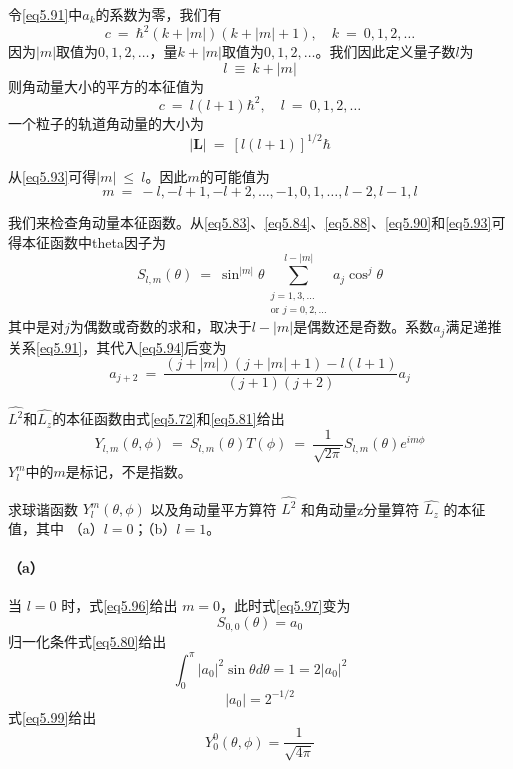 \documentclass[12pt,a4paper,openany]{ctexbook}
\newcommand{\abs}[1]{\left| #1 \right|}
\newcommand{\amv}{\boldsymbol{L}} %
\begin{document}
\begin{flushleft}
令\eqref{eq5.91}中$a_k$的系数为零，我们有
\begin{equation}
    c\ =\ \hbar^2(k+\abs{m})(k+\abs{m}+1),\quad k\ =\ 0,1,2,\dots \label{eq5.92}
\end{equation}
因为$\abs{m}$取值为$0,1,2,\dots$，量$k+\abs{m}$取值为$0,1,2,\dots$。我们因此定义量子数$l$为
\begin{equation}
    l\ \equiv\ k+\abs{m} \label{eq5.93}
\end{equation}
则角动量大小的平方的本征值为
\begin{equation}
    c\ =\ l(l+1)\hbar^2,\quad l\ =\ 0,1,2,\dots \label{eq5.94}
\end{equation}
一个粒子的轨道角动量的大小为
\begin{equation}
    \abs{\amv}\ =\ [l(l+1)]^{1/2}\hbar \label{eq5.95}
\end{equation}

从\eqref{eq5.93}可得$\abs{m}\ \leq\ l$。因此$m$的可能值为
\begin{equation}
    m\ =\ -l,-l+1,-l+2,\dots,-1,0,1,\dots,l-2,l-1,l \label{eq5.96}
\end{equation}

我们来检查角动量本征函数。从\eqref{eq5.83}、\eqref{eq5.84}、\eqref{eq5.88}、\eqref{eq5.90}和\eqref{eq5.93}可得本征函数中theta因子为
\begin{equation}
    S_{l,m}(\theta)\ =\ \sin^{\abs{m}}\theta\sum_{\substack{j=1,3,\ldots \\ \text{or } j=0,2,\ldots}}^{l-\abs{m}}a_j\cos^j\theta \label{eq5.97}
\end{equation}
其中是对$j$为偶数或奇数的求和，取决于$l-\abs{m}$是偶数还是奇数。系数$a_j$满足递推关系\eqref{eq5.91}，其代入\eqref{eq5.94}后变为
\begin{equation}
    a_{j+2}\ =\ \frac{(j+\abs{m})(j+\abs{m}+1)-l(l+1)}{(j+1)(j+2)}a_j \label{eq5.98}
\end{equation}

$\hat{L^2}$和$\hat{L_z}$的本征函数由式\eqref{eq5.72}和\eqref{eq5.81}给出
\begin{equation}
    \boxed{Y_{l,m}(\theta,\phi)\ =\ S_{l,m}(\theta)T(\phi)\ =\ \frac{1}{\sqrt{2\pi}}S_{l,m}(\theta)e^{im\phi}} \label{eq5.99}
\end{equation}
$Y_l^m$中的$m$是标记，不是指数。
\begin{examplebox}
求球谐函数 \(Y_l^m(\theta,\phi)\) 以及角动量平方算符 \(\hat{L^2}\) 和角动量z分量算符 \(\hat{L_z}\) 的本征值，其中 （a）\(l=0\)；（b）\(l=1\)。

\paragraph{（a）} 当 \(l=0\) 时，式\eqref{eq5.96}给出 \(m=0\)，此时式\eqref{eq5.97}变为
\begin{equation}
    S_{0,0}(\theta) = a_0 \label{eq5.100}
\end{equation}
归一化条件式\eqref{eq5.80}给出
\[
\int_0^\pi |a_0|^2 \sin\theta d\theta = 1 = 2|a_0|^2
\]
\[
|a_0| = 2^{-1/2}
\]
式\eqref{eq5.99}给出
\begin{equation}
    Y_0^0(\theta,\phi) = \frac{1}{\sqrt{4\pi}} \label{eq5.101}
\end{equation}


\end{examplebox}
\end{flushleft}
\end{document}
